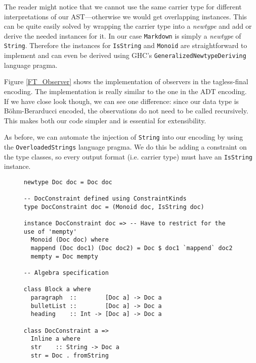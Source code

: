 The reader might notice that we cannot use the same carrier type for different
interpretations of our AST—otherwise we would get overlapping instances. This
can be quite easily solved by wrapping the carrier type into a \emph{newtype}
and add or derive the needed instances for it. In our case \texttt{Markdown} is
simply a \emph{newtype} of \texttt{String}. Therefore the instances for
\texttt{IsString} and \texttt{Monoid} are straightforward to implement and can
even be derived using GHC’s \texttt{GeneralizedNewtypeDeriving} language pragma.

Figure \ref{FT_Observer} shows the implementation of observers in the
tagless-final encoding. The implementation is really similar to the one in the
ADT encoding. If we have close look though, we can see one difference: since our
data type is Böhm-Berarducci encoded, the observations do not need to be called
recursively. This makes both our code simpler and is essential for
extensibility.

As before, we can automate the injection of \texttt{String} into our encoding by
using the \texttt{OverloadedStrings} language pragma. We do this be adding a
constraint on the type classes, so every output format (i.e. carrier type) must
have an \texttt{IsString} instance.

\begin{figure}
\begin{lstlisting}
newtype Doc doc = Doc doc

-- DocConstraint defined using ConstraintKinds
type DocConstraint doc = (Monoid doc, IsString doc)

instance DocConstraint doc => -- Have to restrict for the use of 'mempty'
  Monoid (Doc doc) where
  mappend (Doc doc1) (Doc doc2) = Doc $ doc1 `mappend` doc2
  mempty = Doc mempty

-- Algebra specification

class Block a where
  paragraph  ::        [Doc a] -> Doc a
  bulletList ::        [Doc a] -> Doc a
  heading    :: Int -> [Doc a] -> Doc a

class DocConstraint a =>
  Inline a where
  str    :: String -> Doc a
  str = Doc . fromString
\end{lstlisting}
\end{figure}

